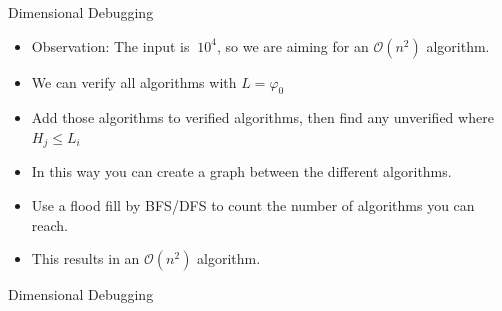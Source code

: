 \documentclass[11pt,pdf, aspectratio=169]{beamer}
\begin{document}
  \begin{frame}{Dimensional Debugging}
    \begin{itemize}
      \item Observation: The input is $~10^4$, so we are aiming for an $\mathcal{O}(n^2)$ algorithm.
      \item We can verify all algorithms with $L = \varphi_0$
      \item Add those algorithms to verified algorithms, then find any unverified where $H_j \leq L_i$
      \item In this way you can create a graph between the different algorithms.
      \item Use a flood fill by BFS/DFS to count the number of algorithms you can reach.
      \item This results in an $\mathcal{O}(n^2)$ algorithm.
    \end{itemize}
  \end{frame}
  \begin{frame}[containsverbatim]{Dimensional Debugging}
    \inputminted[fontsize=\tiny]{python}{code/session-1/python/dapc-d.py}
  \end{frame}
\end{document}
